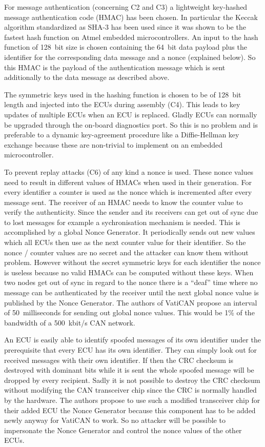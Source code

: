For message authentication (concerning C2 and C3) a lightweight key-hashed message authentication code (HMAC) has been chosen. In particular the Keccak algorithm standardized as SHA-3 has been used since it was shown to be the fastest hash function on Atmel embedded microcontrollers. An input to the hash function of 128~bit size is chosen containing the 64~bit data payload plus the identifier for the corresponding data message and a nonce (explained below). So this HMAC is the payload of the authentication message which is sent additionally to the data message as described above.

The symmetric keys used in the hashing function is chosen to be of 128~bit length and injected into the ECUs during assembly (C4). This leads to key updates of multiple ECUs when an ECU is replaced. Gladly ECUs can normally be upgraded through the on-board diagnostics port. So this is no problem and is preferable to a dynamic key-agreement procedure like a Diffie-Hellman key exchange because these are non-trivial to implement on an embedded microcontroller.

To prevent replay attacks (C6) of any kind a nonce is used. These nonce values need to result in different values of HMACs when used in their generation. For every identifier a counter is used as the nonce which is incremented after every message sent. The receiver of an HMAC needs to know the counter value to verify the authenticity. Since the sender and its receivers can get out of sync due to lost messages for example a sychronisation mechanism is needed. This is accomplished by a global Nonce Generator. It periodically sends out new values which all ECUs then use as the next counter value for their identifier. So the nonce / counter values are no secret and the attacker can know them without problem. However without the secret symmetric keys for each identifier the nonce is useless because no valid HMACs can be computed without these keys. When two nodes get out of sync in regard to the nonce there is a ``deaf'' time where no message can be authenticated by the receiver until the next global nonce value is published by the Nonce Generator. The authors of VatiCAN propose an interval of 50~milliseconds for sending out global nonce values. This would be 1\% of the bandwidth of a 500~kbit/s CAN network. 

An ECU is easily able to identify spoofed messages of its own identifier under the prerequisite that every ECU has its own identifier. They can simply look out for received messages with their own identifier. If then the CRC checksum is destroyed with dominant bits while it is sent the whole spoofed message will be dropped by every recipient. Sadly it is not possible to destroy the CRC checksum without modifying the CAN transceiver chip since the CRC is normally handled by the hardware. The authors propose to use such a modified transceiver chip for their added ECU the Nonce Generator because this component has to be added newly anyway for VatiCAN to work. So no attacker will be possible to impersonate the Nonce Generator and control the nonce values of the other ECUs.